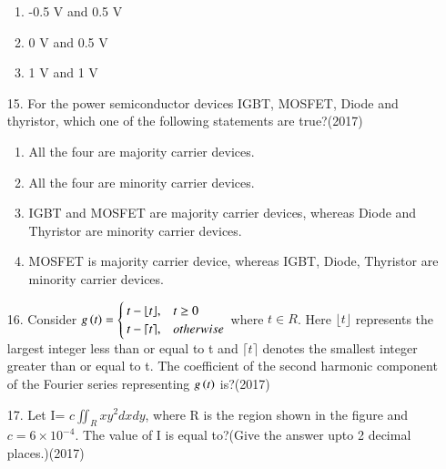 \documentclass[journal]{IEEEtran}
\begin{document}
\begin{enumerate}
\begin{enumerate}[label=(\Alph*)]
        \item -0.5 V and 0.5 V
        \item 0 V and 0.5 V
        \item 1 V and 1 V
    \end{enumerate}
    \item[15.] For the power semiconductor devices IGBT, MOSFET, Diode and thyristor, which one of the following statements are true?\hfill (2017)
    \begin{enumerate}[label=(\Alph*)]
        \item All the four are majority carrier devices.
        \item All the four are minority carrier devices.
        \item IGBT and MOSFET are majority carrier devices, whereas Diode and Thyristor are minority carrier devices.
        \item MOSFET is majority carrier device, whereas IGBT, Diode, Thyristor are minority carrier devices.
    \end{enumerate}
    \item[16.] Consider $g\left(t\right)=\begin{cases}t-\lfloor t \rfloor, & t\geq 0\\ t-\lceil t \rceil, & otherwise \end{cases}$ where $t \in R$. Here $\lfloor t \rfloor$ represents the largest integer less than or equal to t and  $\lceil t \rceil$ denotes the smallest integer greater than or equal to t. The coefficient of the second harmonic component of the Fourier series representing $g\left(t\right)$ is?\hfill (2017)
    \item[17.] Let I= $c\iint_R xy^2 dxdy$, where R is the region shown in the figure and $c = 6\times 10^{-4}$. The value of I is equal to?(Give the answer upto 2 decimal places.)\hfill (2017)
    \begin{figure}[!ht]
        \centering
\end{figure}
\end{enumerate}
\end{document}
